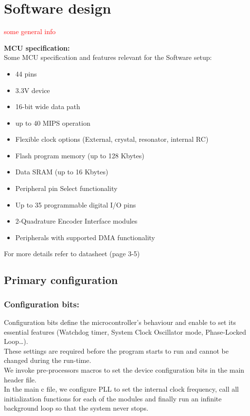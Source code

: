 \section{Software design} \label{chap:software}
\textcolor{red}{some general info}

\textbf{MCU specification:}\\
Some MCU specification and features relevant for the Software setup:
\begin{itemize}
    \item 44 pins
    \item 3.3V device 
    \item 16-bit wide data path
    \item up to 40 MIPS operation
    \item Flexible clock options (External, crystal, resonator, internal RC)
    \item Flash program memory (up to 128 Kbytes)
    \item Data SRAM (up to 16 Kbytes)
    \item Peripheral pin Select functionality
    \item Up to 35 programmable digital I/O pins
    \item 2-Quadrature Encoder Interface modules
    \item Peripherals with supported DMA functionality
\end{itemize}
For more details refer to datasheet (page 3-5)

\subsection{Primary configuration}

\subsubsection*{Configuration bits:}

Configuration bits define the microcontroller’s behaviour and enable to set its essential features (Watchdog timer, System Clock Oscillator mode, Phase-Locked Loop…).\\
These settings are required before the program starts to run and cannot be changed during the run-time.\\
We invoke pre-processors macros to set the device configuration bits in the main header file.\\
In the main c file, we configure PLL to set the internal clock frequency, call all initialization functions for each of the modules and finally run an infinite background loop so that the system never stops.

